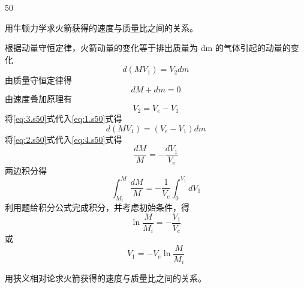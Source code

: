\begin{solution}{50}
\begin{subsolution}
用牛顿力学求火箭获得的速度与质量比之间的关系。

根据动量守恒定律，火箭动量的变化等于排出质量为 dm 的气体引起的动量的变化
\begin{equation}
d(MV_{1}) = V_{2}dm
\label{eq:1.s50}
\end{equation}
由质量守恒定律得
\begin{equation}
dM + dm = 0
\label{eq:2.s50}
\end{equation}
由速度叠加原理有
\begin{equation}
V_{2} = V_{e} - V_{1}
\label{eq:3.s50}
\end{equation}
将\eqref{eq:3.s50}式代入\eqref{eq:1.s50}式得
\begin{equation}
d(MV_{1}) = (V_{e} - V_{1})dm
\label{eq:4.s50}
\end{equation}
将\eqref{eq:2.s50}式代入\eqref{eq:4.s50}式得
\begin{equation}
\frac{dM}{M} = -\frac{dV_{1}}{V_{e}}
\label{eq:5.s50}
\end{equation}
两边积分得
\begin{equation}
\int_{M_{i}}^{M} \frac{dM}{M} = -\frac{1}{V_{e}} \int_{0}^{V_{1}} dV_{1}
\label{eq:6.s50}
\end{equation}
利用题给积分公式完成积分，并考虑初始条件，得
\begin{equation}
\ln \frac{M}{M_{i}} = -\frac{V_{1}}{V_{e}}
\label{eq:7.s50}
\end{equation}
或
\begin{equation}
V_{1} = -V_{e} \ln \frac{M}{M_{i}}
\label{eq:8.s50}
\end{equation}
\end{subsolution}
\begin{subsolution}
用狭义相对论求火箭获得的速度与质量比之间的关系。


\end{subsolution}
\end{solution}
